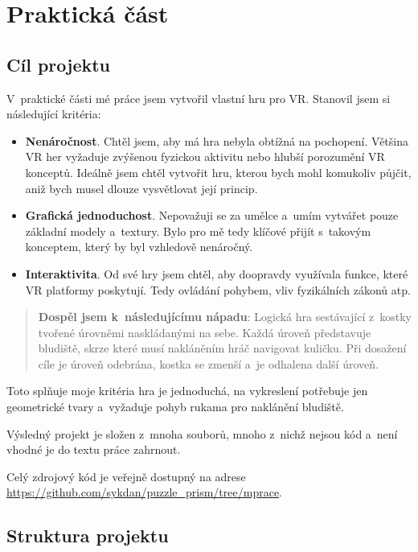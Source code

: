 \part{Praktická část}

\chapter{Cíl projektu}

V~praktické části mé práce jsem vytvořil vlastní hru pro VR. Stanovil jsem si následující kritéria:

\begin{itemize}
  \item \textbf{Nenáročnost}. Chtěl jsem, aby má hra nebyla obtížná na pochopení. Většina VR her vyžaduje zvýšenou fyzickou aktivitu nebo hlubší porozumění VR konceptů. Ideálně jsem chtěl vytvořit hru, kterou bych mohl komukoliv půjčit, aniž bych musel dlouze vysvětlovat její princip.
  \item \textbf{Grafická jednoduchost}. Nepovažuji se za umělce a~umím vytvářet pouze základní modely a~textury. Bylo pro mě tedy klíčové přijít s~takovým konceptem, který by byl vzhledově nenáročný.
  \item \textbf{Interaktivita}. Od své hry jsem chtěl, aby doopravdy využívala funkce, které VR platformy poskytují. Tedy ovládání pohybem, vliv fyzikálních zákonů atp.
\end{itemize}

\begin{quotation}
  \textbf{Dospěl jsem k~následujícímu nápadu}: Logická hra sestávající z~kostky tvořené úrovněmi naskládanými na sebe. Každá úroveň představuje bludiště, skrze které musí nakláněním hráč navigovat kuličku. Při dosažení cíle je úroveň odebrána, kostka se zmenší a~je odhalena další úroveň.
\end{quotation}

Toto splňuje moje kritéria \poml hra je jednoduchá, na vykreslení potřebuje jen geometrické tvary a~vyžaduje pohyb rukama pro naklánění bludiště.

Výsledný projekt je složen z~mnoha souborů, mnoho z~nichž nejsou kód a~není vhodné je do textu práce zahrnout. 

Celý zdrojový kód je veřejně dostupný na adrese \url{https://github.com/sykdan/puzzle_prism/tree/mprace}. 

\chapter{Struktura projektu}

